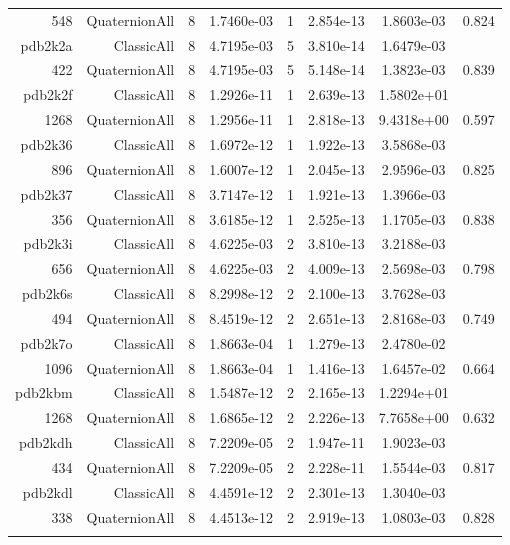 \begin{xltabular}{\textwidth}{r|rcS[table-format=1.4e+2]cS[table-format=1.3e+2]S[table-format=1.4e+2]S[table-format=-1.3]}
548 & QuaternionAll & 8 & 1.7460e-03 & 1 & 2.854e-13 & 1.8603e-03 & 0.824\\  \addlinespace
pdb2k2a & ClassicAll & 8 & 4.7195e-03 & 5 & 3.810e-14 & 1.6479e-03 & \\
422 & QuaternionAll & 8 & 4.7195e-03 & 5 & 5.148e-14 & 1.3823e-03 & 0.839\\  \addlinespace
{\color{red} pdb2k2f } & ClassicAll & 8 & 1.2926e-11 & 1 & 2.639e-13 & 1.5802e+01 & \\
1268 & QuaternionAll & 8 & 1.2956e-11 & 1 & 2.818e-13 & 9.4318e+00 & 0.597\\  \addlinespace
pdb2k36 & ClassicAll & 8 & 1.6972e-12 & 1 & 1.922e-13 & 3.5868e-03 & \\
896 & QuaternionAll & 8 & 1.6007e-12 & 1 & 2.045e-13 & 2.9596e-03 & 0.825\\  \addlinespace
pdb2k37 & ClassicAll & 8 & 3.7147e-12 & 1 & 1.921e-13 & 1.3966e-03 & \\
356 & QuaternionAll & 8 & 3.6185e-12 & 1 & 2.525e-13 & 1.1705e-03 & 0.838\\  \addlinespace
pdb2k3i & ClassicAll & 8 & 4.6225e-03 & 2 & 3.810e-13 & 3.2188e-03 & \\
656 & QuaternionAll & 8 & 4.6225e-03 & 2 & 4.009e-13 & 2.5698e-03 & 0.798\\  \addlinespace
pdb2k6s & ClassicAll & 8 & 8.2998e-12 & 2 & 2.100e-13 & 3.7628e-03 & \\
494 & QuaternionAll & 8 & 8.4519e-12 & 2 & 2.651e-13 & 2.8168e-03 & 0.749\\  \addlinespace
pdb2k7o & ClassicAll & 8 & 1.8663e-04 & 1 & 1.279e-13 & 2.4780e-02 & \\
1096 & QuaternionAll & 8 & 1.8663e-04 & 1 & 1.416e-13 & 1.6457e-02 & 0.664\\  \addlinespace
{\color{red} pdb2kbm } & ClassicAll & 8 & 1.5487e-12 & 2 & 2.165e-13 & 1.2294e+01 & \\
1268 & QuaternionAll & 8 & 1.6865e-12 & 2 & 2.226e-13 & 7.7658e+00 & 0.632\\  \addlinespace
pdb2kdh & ClassicAll & 8 & 7.2209e-05 & 2 & 1.947e-11 & 1.9023e-03 & \\
434 & QuaternionAll & 8 & 7.2209e-05 & 2 & 2.228e-11 & 1.5544e-03 & 0.817\\  \addlinespace
pdb2kdl & ClassicAll & 8 & 4.4591e-12 & 2 & 2.301e-13 & 1.3040e-03 & \\
338 & QuaternionAll & 8 & 4.4513e-12 & 2 & 2.919e-13 & 1.0803e-03 & 0.828\\  \addlinespace

\end{xltabular}
